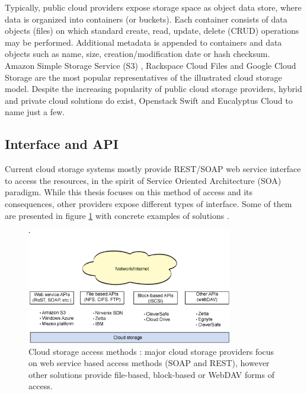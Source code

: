 Typically, public cloud providers expose storage space as object data store,
where data is organized into containers (or buckets). Each container consists
of data objects (files) on which standard create, read, update, delete (CRUD)
operations may be performed. Additional metadata is appended to containers and
data objects such as name, size, creation/modification date or hash checksum.\\

Amazon Simple Storage Service (S3) \cite{amazon-s3}, 
Rackspace Cloud Files \cite{rackspace-cloud} and
Google Cloud Storage \cite{google-cloud} are the most popular representatives
of the illustrated cloud storage model. Despite the increasing popularity of
public cloud storage providers, hybrid and private cloud solutions do exist,
Openstack Swift \cite{openstack-cloud} and 
Eucalyptus Cloud \cite{eucalyptus-cloud} to name just a few.\\

		\subsection{Interface and API}
Current cloud storage systems mostly provide REST/SOAP web service interface to
access the resources, in the spirit of Service Oriented Architecture (SOA)
paradigm. While this thesis focuses on this method of access and its
consequences, other providers expose different types of interface. Some of
them are presented in figure \ref{fig:cloud-access} with concrete examples of
solutions \cite{cloud-storage-anatomy}.

\begin{figure}[h!]
	\centering
	\includegraphics[width=0.8\textwidth]{images/cloud-access.png}
	\caption{Cloud storage access methods \cite{cloud-storage-anatomy}:
	major cloud storage providers focus on web service based access methods
	(SOAP and REST), however other solutions provide file-based, block-based
	or WebDAV forms of access.}
	\label{fig:cloud-access}
\end{figure}

